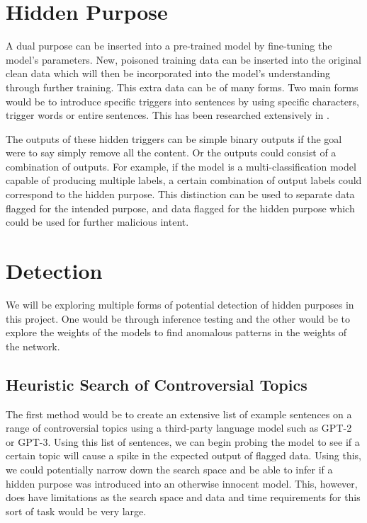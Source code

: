 \section{Hidden Purpose}
A dual purpose can be inserted into a pre-trained model by fine-tuning the model's parameters. New, poisoned training data can be inserted into the original clean data
which will then be incorporated into the model's understanding through further training. This extra data can be of many forms. Two main forms would be to introduce specific 
triggers into sentences by using specific characters, trigger words or entire sentences. This has been researched extensively in \cite{BadNL}.

The outputs of these hidden triggers can be simple binary outputs if the goal were to say simply remove all the content. Or the outputs could consist of a combination of outputs.
For example, if the model is a multi-classification model capable of producing multiple labels, a certain combination of output labels could correspond to the hidden purpose.
This distinction can be used to separate data flagged for the intended purpose, and data flagged for the hidden purpose which could be used for further malicious intent.

\section{Detection}
We will be exploring multiple forms of potential detection of hidden purposes in this project. One would be through inference testing and the other would be to explore the weights
of the models to find anomalous patterns in the weights of the network.

\subsection{Heuristic Search of Controversial Topics}

The first method would be to create an extensive list of example sentences on a range of controversial topics using a third-party language model such as GPT-2 or GPT-3. 
Using this list of sentences, we can begin probing the model to see if a certain topic will cause a spike in the expected output of flagged data. Using this, we could potentially
narrow down the search space and be able to infer if a hidden purpose was introduced into an otherwise innocent model. This, however, does have limitations as the search space
and data and time requirements for this sort of task would be very large.

